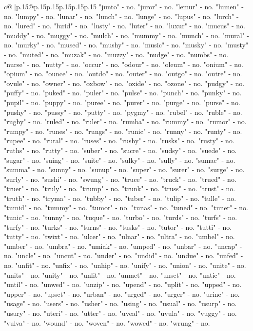 \documentclass{article}
\begin{document}
{\begin{supertabular}{c@{$\;$}|p{.15\linewidth}@{}p{.15\linewidth}p{.15\linewidth}p{.15\linewidth}p{.15\linewidth}p{.15\linewidth}}
{{{"junto" {-} no. "juror" {-} no. "lemur" {-} no. "lumen" {-} no. "lumpy" {-} no. "lunar" {-} no. "lunch" {-} no. "lunge" {-} no. "lupus" {-} no. "lurch" {-} no. "lured" {-} no. "lurid" {-} no. "lusty" {-} no. "luter" {-} no. "luxur" {-} no. "mucus" {-} no. "muddy" {-} no. "muggy" {-} no. "mulch" {-} no. "mummy" {-} no. "munch" {-} no. "mural" {-} no. "murky" {-} no. "mused" {-} no. "mushy" {-} no. "music" {-} no. "musky" {-} no. "musty" {-} no. "muted" {-} no. "muzak" {-} no. "muzzy" {-} no. "nudge" {-} no. "numbs" {-} no. "nurse" {-} no. "nutty" {-} no. "occur" {-} no. "odour" {-} no. "oleum" {-} no. "onium" {-} no. "opium" {-} no. "ounce" {-} no. "outdo" {-} no. "outer" {-} no. "outgo" {-} no. "outre" {-} no. "ovule" {-} no. "owner" {-} no. "oxbow" {-} no. "oxide" {-} no. "ozone" {-} no. "pudgy" {-} no. "puffy" {-} no. "puked" {-} no. "puler" {-} no. "pulse" {-} no. "punch" {-} no. "punky" {-} no. "pupil" {-} no. "puppy" {-} no. "puree" {-} no. "purer" {-} no. "purge" {-} no. "purse" {-} no. "pushy" {-} no. "pussy" {-} no. "putty" {-} no. "pygmy" {-} no. "rubel" {-} no. "ruble" {-} no. "rugby" {-} no. "ruled" {-} no. "ruler" {-} no. "rumba" {-} no. "rummy" {-} no. "rumor" {-} no. "rumpy" {-} no. "runes" {-} no. "rungs" {-} no. "runic" {-} no. "runny" {-} no. "runty" {-} no. "rupee" {-} no. "rural" {-} no. "ruses" {-} no. "rushy" {-} no. "rusks" {-} no. "rusty" {-} no. "ruths" {-} no. "rutty" {-} no. "suber" {-} no. "sucre" {-} no. "sudsy" {-} no. "suede" {-} no. "sugar" {-} no. "suing" {-} no. "suite" {-} no. "sulky" {-} no. "sully" {-} no. "sumac" {-} no. "summa" {-} no. "sunny" {-} no. "sunup" {-} no. "super" {-} no. "surer" {-} no. "surge" {-} no. "surly" {-} no. "sushi" {-} no. "swung" {-} no. "truce" {-} no. "truck" {-} no. "trued" {-} no. "truer" {-} no. "truly" {-} no. "trump" {-} no. "trunk" {-} no. "truss" {-} no. "trust" {-} no. "truth" {-} no. "tryma" {-} no. "tubby" {-} no. "tuber" {-} no. "tulip" {-} no. "tulle" {-} no. "tumid" {-} no. "tummy" {-} no. "tumor" {-} no. "tunas" {-} no. "tuned" {-} no. "tuner" {-} no. "tunic" {-} no. "tunny" {-} no. "tuque" {-} no. "turbo" {-} no. "turds" {-} no. "turfs" {-} no. "turfy" {-} no. "turks" {-} no. "turns" {-} no. "tusks" {-} no. "tutor" {-} no. "tutti" {-} no. "tutty" {-} no. "twixt" {-} no. "ulcer" {-} no. "ulnar" {-} no. "ultra" {-} no. "umbel" {-} no. "umber" {-} no. "umbra" {-} no. "umiak" {-} no. "umped" {-} no. "unbar" {-} no. "uncap" {-} no. "uncle" {-} no. "uncut" {-} no. "under" {-} no. "undid" {-} no. "undue" {-} no. "unfed" {-} no. "unfit" {-} no. "unfix" {-} no. "unhip" {-} no. "unify" {-} no. "union" {-} no. "unite" {-} no. "units" {-} no. "unity" {-} no. "unlit" {-} no. "unmet" {-} no. "unset" {-} no. "untie" {-} no. "until" {-} no. "unwed" {-} no. "unzip" {-} no. "upend" {-} no. "uplit" {-} no. "upped" {-} no. "upper" {-} no. "upset" {-} no. "urban" {-} no. "urged" {-} no. "urger" {-} no. "urine" {-} no. "usage" {-} no. "users" {-} no. "usher" {-} no. "using" {-} no. "usual" {-} no. "usurp" {-} no. "usury" {-} no. "uteri" {-} no. "utter" {-} no. "uveal" {-} no. "uvula" {-} no. "vuggy" {-} no. "vulva" {-} no. "wound" {-} no. "woven" {-} no. "wowed" {-} no. "wrung" {-} no. }}}
\end{supertabular}}
\end{document}
